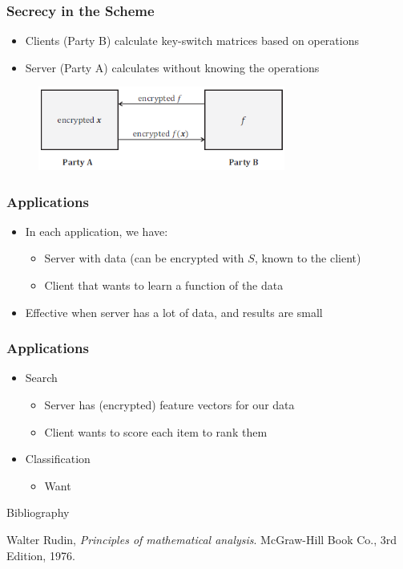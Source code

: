 \documentclass{beamer}
\newcommand{\itz}[1]{\begin{itemize}#1\end{itemize}} %
\begin{document}
\begin{frame}
\frametitle{Secrecy in the Scheme}

\itz{
\item{ Clients (Party B) calculate key-switch matrices based on operations }
\item{ Server (Party A) calculates without knowing the operations }
}
\vspace{.07in}
\begin{figure}[ht]
\centering
\includegraphics[width=3.2in]{eve}
\end{figure}
\end{frame}



\begin{frame}
\frametitle{Applications}

\itz{
\item{In each application, we have:
 \itz{
 	\item{Server with data (can be encrypted with $S$, known to the client)}
 	\item{Client that wants to learn a function of the data}
 	}
 }
\vspace{.15in}
\item{Effective when server has a lot of data, and results are small}
}
\end{frame}


\begin{frame}
\frametitle{Applications}

\itz{
\item{Search
 \itz{
 	\item{Server has (encrypted) feature vectors for our data}
 	\item{Client wants to score each item to rank them}
	}
 }
\vspace{.15in}
\item{Classification
	\itz {
		\item{Want}
	}
}
}
\end{frame}


\begin{frame}{Bibliography}
\begin{thebibliography}{9}
  Walter Rudin,
  \emph{Principles of mathematical analysis}.
  McGraw-Hill Book Co.,
  3rd Edition,
  1976.
\end{thebibliography}
\end{frame}
\end{document}
